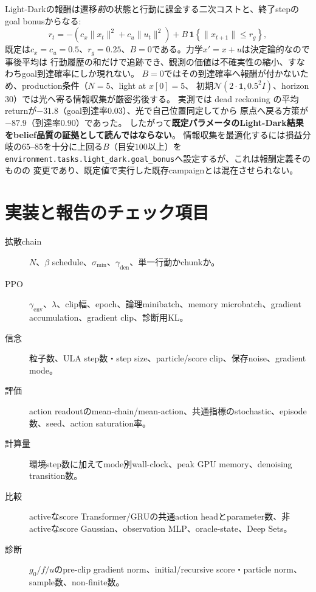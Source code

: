 \documentclass[a4paper,11pt]{article}
\newcommand{\Normal}{\mathcal{N}}
\newcommand{\env}{\mathrm{env}}
\newcommand{\den}{\mathrm{den}}
\begin{document}
\begin{enumerate}
    Light-Darkの報酬は遷移\emph{前}の状態と行動に課金する二次コストと、終了stepの
    goal bonusからなる:
    \[
      r_t=-\left(c_x\lVert x_t\rVert^2+c_u\lVert u_t\rVert^2\right)
        +B\,\mathbf 1\!\left\{\lVert x_{t+1}\rVert\leq r_g\right\},
    \]
    既定は$c_x=c_u=0.5$、$r_g=0.25$、$B=0$である。力学$x'=x+u$は決定論的なので事後平均は
    行動履歴の和だけで追跡でき、観測の価値は不確実性の縮小、すなわちgoal到達確率にしか現れない。
    $B=0$ではその到達確率へ報酬が付かないため、production条件（$N=5$、light at $x[0]=5$、
    初期$\Normal(2\cdot\mathbf 1,0.5^2I)$、horizon 30）では光へ寄る情報収集が厳密劣後する。
    実測では dead reckoning の平均returnが$-31.8$（goal到達率$0.03$）、光で自己位置同定してから
    原点へ戻る方策が$-87.9$（到達率$0.90$）であった。
    したがって\textbf{既定パラメータのLight-Dark結果をbelief品質の証拠として読んではならない}。
    情報収集を最適化するには損益分岐の$65$--$85$を十分に上回る$B$（目安$100$以上）を
    \texttt{environment.tasks.light\_dark.goal\_bonus}へ設定するが、これは報酬定義そのものの
    変更であり、既定値で実行した既存campaignとは混在させられない。
\end{enumerate}

\section{実装と報告のチェック項目}

\begin{description}
  \item[拡散chain] $N$、$\beta$ schedule、$\sigma_{\min}$、$\gamma_{\den}$、単一行動かchunkか。
  \item[PPO] $\gamma_{\env}$、$\lambda$、clip幅、epoch、論理minibatch、memory microbatch、gradient accumulation、gradient clip、診断用KL。
  \item[信念] 粒子数、ULA step数・step size、particle/score clip、保存noise、gradient mode。
  \item[評価] action readoutのmean-chain/mean-action、共通指標のstochastic、episode数、seed、action saturation率。
  \item[計算量] 環境step数に加えてmode別wall-clock、peak GPU memory、denoising transition数。
  \item[比較] activeなscore Transformer/GRUの共通action headとparameter数、非activeなscore Gaussian、observation MLP、oracle-state、Deep Sets。
  \item[診断] $g_0/f/u$のpre-clip gradient norm、initial/recursive score・particle norm、sample数、non-finite数。
\end{description}
\end{document}
